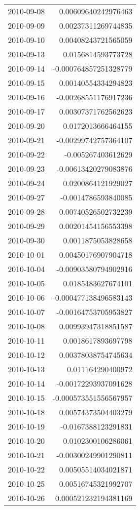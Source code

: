 \begin{tabular}{l | r}
2010-09-08 & 0.00609640242976463 \\
2010-09-09 & 0.00237311269744835 \\
2010-09-10 & 0.00408243721565059 \\
2010-09-13 & 0.0156814593773728 \\
2010-09-14 & -0.000764857251328779 \\
2010-09-15 & 0.00140554334294823 \\
2010-09-16 & -0.00268551176917236 \\
2010-09-17 & 0.00307371762562623 \\
2010-09-20 & 0.0172013666464155 \\
2010-09-21 & -0.00299742757364107 \\
2010-09-22 & -0.005267403612629 \\
2010-09-23 & -0.00613420279083876 \\
2010-09-24 & 0.0200864121929027 \\
2010-09-27 & -0.0014786593840085 \\
2010-09-28 & 0.00740526502732239 \\
2010-09-29 & 0.00201454156553398 \\
2010-09-30 & 0.0011875053828658 \\
2010-10-01 & 0.00450176907904718 \\
2010-10-04 & -0.00903580794902916 \\
2010-10-05 & 0.0185483627674101 \\
2010-10-06 & -0.000477138496583143 \\
2010-10-07 & -0.00164753705953827 \\
2010-10-08 & 0.00993947318851587 \\
2010-10-11 & 0.0018617893697798 \\
2010-10-12 & 0.00378038754745634 \\
2010-10-13 & 0.011164290400972 \\
2010-10-14 & -0.00172293937091628 \\
2010-10-15 & -0.000573551556567957 \\
2010-10-18 & 0.00574373504403279 \\
2010-10-19 & -0.0167388123291831 \\
2010-10-20 & 0.0102300106286061 \\
2010-10-21 & -0.00300249901290811 \\
2010-10-22 & 0.00505514034021871 \\
2010-10-25 & 0.00516745321992707 \\
2010-10-26 & 0.000521232194381169 \\

\end{tabular}
